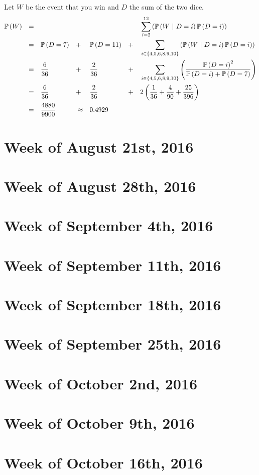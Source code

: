 \documentclass{article}
\begin{document}
\noindent Let $W$ be the event that you win and $D$ the sum of the two dice.
\begin{align*}
\mathbb{P}\left(W\right) 	&&= &&&&&&&&&&&\sum_{i=2}^{12} \left(\mathbb{P}\left(W\ |\  D=i\right)\mathbb{P}\left(D=i\right)\right) \\
			&&= &&&\mathbb{P}\left(D=7\right) &&+ &&\mathbb{P}\left(D=11\right) &&+ &&\sum_{i \in \{4,5,6,8,9,10\}} \left(\mathbb{P}\left(W\ |\  D=i\right)\mathbb{P}\left(D=i\right)\right) \\
			&&= &&&\frac{6}{36} &&+ &&\frac{2}{36} &&+ &&\sum_{i \in \{4,5,6,8,9,10\}} \left(\frac{\mathbb{P}\left(D=i\right)^2}{\mathbb{P}\left(D=i\right)+\mathbb{P}\left(D=7\right)}\right) \\
			&&= &&&\frac{6}{36} &&+ &&\frac{2}{36} &&+ &&2\left(\frac{1}{36} + \frac{4}{90} + \frac{25}{396}\right) \\
			&&= &&&\frac{4880}{9900} &&\approx &&0.4929
\end{align*}

\section{Week of August 21st, 2016}
\section{Week of August 28th, 2016}
\section{Week of September 4th, 2016}
\section{Week of September 11th, 2016}
\section{Week of September 18th, 2016}
\section{Week of September 25th, 2016}
\section{Week of October 2nd, 2016}
\section{Week of October 9th, 2016}
\section{Week of October 16th, 2016}
\end{document}
